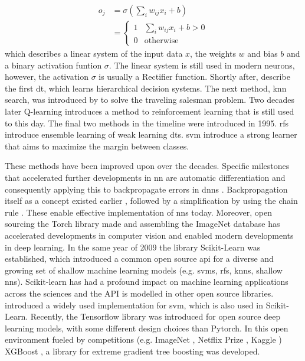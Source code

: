 \begin{equation}
\begin{array}{ll}
    o_{j} & = \sigma \left(\sum_i w_{ij} x_{i} + b\right)\\
    & = \begin{cases}1&\sum_i w_{ij} x_{i} + b > 0 \\ 0 &\text{otherwise}   \end{cases}
\end{array}
\end{equation}
which describes a linear system of the input data $x$, the weights $w$ and bias $b$ and a binary activation funtion $\sigma$. The linear system is still used in modern neurons, however, the activation $\sigma$ is usually a Rectifier function. Shortly after, \citet{belson1959matching} describe the first \acf{dt}, which learns hierarchical decision systems. The next method, \ac{knn} search, was introduced by \citet{cover1967nearest} to solve the traveling salesman problem. Two decades later Q-learning \citep{watkins1989learning} introduces a method to reinforcement learning that is still used to this day. The final two methods in the timeline were introduced in 1995. \acfp{rf} \citep{ho1995random} introduce ensemble learning of weak learning \acfp{dt}. \acf{svm} \citep{cortes1995support} introduce a strong learner that aims to maximize the margin between classes.

These methods have been improved upon over the decades. Specific milestones that accelerated further developments in \ac{nn} are automatic differentiation \citep{linnainmaa1970representation} and consequently applying this to backpropagate errors in \acp{dnn} \citep{rumelhart1988learning}. Backpropagation itself as a concept existed earlier \citep{kelley1960gradient, bryson1961gradient}, followed by a simplification by using the chain rule \citep{dreyfus1962numerical}. These enable effective implementation of \acp{nn} today. Moreover, open sourcing the Torch library \citep{collobert2002torch} made and assembling the ImageNet database \citep{deng2009imagenet} has accelerated developments in computer vision and enabled modern developments in deep learning. In the same year of 2009 the library Scikit-Learn \citep{scikit-learn} was established, which introduced a common open source \ac{api} \citep{sklearn_api} for a diverse and growing set of shallow machine learning models (e.g. \acp{svm}, \acp{rf}, \acp{knn}, shallow \acp{nn}). Scikit-learn has had a profound impact on machine learning applications across the sciences and the API is modelled in other open source libraries. \citet{libsvm} introduced a widely used implementation for \acf{svm}, which is also used in Scikit-Learn. Recently, the Tensorflow library \citep{tensorflow} was introduced for open source deep learning models, with some different design choices than Pytorch. In this open environment fueled by competitions (e.g. ImageNet \citep{ILSVRCanalysis_ICCV2013}, Netflix Prize \citep{bennett2007netflix}, Kaggle \citep{goodfellow2013challenges}) XGBoost \citep{xgboost}, a library for extreme gradient tree boosting was developed.

